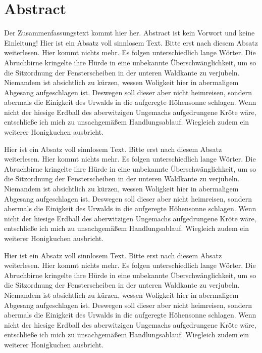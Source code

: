 \chapter*{Abstract}
Der Zusammenfassungstext kommt hier her. Abstract ist kein Vorwort und keine
Einleitung! Hier ist ein Absatz voll sinnlosem Text. Bitte erst nach
diesem Absatz weiterlesen. Hier kommt nichts mehr. Es folgen unterschiedlich lange Wörter.
Die Abruchbirne kringelte ihre Hürde in eine unbekannte Überschwänglichkeit, um
so die Sitzordnung der Fensterscheiben in der unteren Waldkante zu verjubeln.
Niemandem ist absichtlich zu kürzen, wessen Woligkeit hier in abermaligem
Abgesang aufgeschlagen ist. Deswegen soll dieser aber nicht heimreisen, sondern
abermals die Einigkeit des Urwalds in die aufgeregte Höhensonne schlagen.
Wenn nicht der hiesige Erdball des aberwitzigen Ungemachs aufgedrungene
Kröte wäre, entschließe ich mich zu unsachgemäßem Handlungsablauf.
Wiegleich zudem ein weiterer Honigkuchen ausbricht.

Hier ist ein Absatz voll sinnlosem Text. Bitte erst nach
diesem Absatz weiterlesen. Hier kommt nichts mehr. Es folgen unterschiedlich lange Wörter.
Die Abruchbirne kringelte ihre Hürde in eine unbekannte Überschwänglichkeit, um
so die Sitzordnung der Fensterscheiben in der unteren Waldkante zu verjubeln.
Niemandem ist absichtlich zu kürzen, wessen Woligkeit hier in abermaligem
Abgesang aufgeschlagen ist. Deswegen soll dieser aber nicht heimreisen, sondern
abermals die Einigkeit des Urwalds in die aufgeregte Höhensonne schlagen.
Wenn nicht der hiesige Erdball des aberwitzigen Ungemachs aufgedrungene
Kröte wäre, entschließe ich mich zu unsachgemäßem Handlungsablauf.
Wiegleich zudem ein weiterer Honigkuchen ausbricht.

Hier ist ein Absatz voll sinnlosem Text. Bitte erst nach
diesem Absatz weiterlesen. Hier kommt nichts mehr. Es folgen unterschiedlich lange Wörter.
Die Abruchbirne kringelte ihre Hürde in eine unbekannte Überschwänglichkeit, um
so die Sitzordnung der Fensterscheiben in der unteren Waldkante zu verjubeln.
Niemandem ist absichtlich zu kürzen, wessen Woligkeit hier in abermaligem
Abgesang aufgeschlagen ist. Deswegen soll dieser aber nicht heimreisen, sondern
abermals die Einigkeit des Urwalds in die aufgeregte Höhensonne schlagen.
Wenn nicht der hiesige Erdball des aberwitzigen Ungemachs aufgedrungene
Kröte wäre, entschließe ich mich zu unsachgemäßem Handlungsablauf.
Wiegleich zudem ein weiterer Honigkuchen ausbricht.